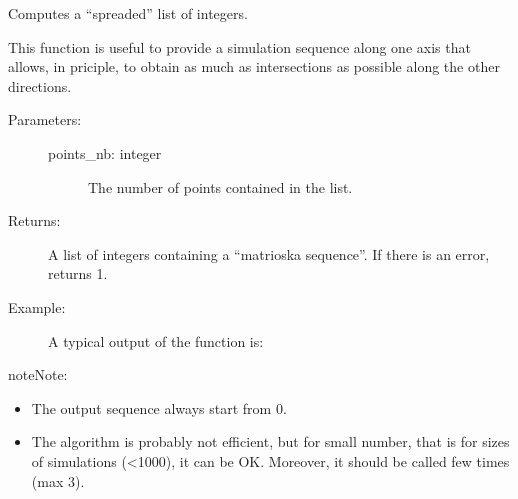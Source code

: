 \documentclass[letterpaper,10pt,english]{sphinxmanual}
\begin{document}
\begin{fulllineitems}
\label{\detokenize{appendices:s2Dcd.s2Dcd.matrioska_interval}}
Computes a “spreaded” list of integers.

This function is useful to provide a simulation sequence along one
axis that allows, in priciple, to obtain as much as intersections
as possible along the other directions.
\begin{description}
\item[{Parameters:}] \leavevmode\begin{description}
\item[{points\_nb: integer}] \leavevmode
The number of points contained in the list.

\end{description}

\item[{Returns:}] \leavevmode
A list of integers containing a “matrioska sequence”.
If there is an error, returns \sphinxhyphen{}1.

\item[{Example:}] \leavevmode
A typical output of the function is:

\begin{sphinxVerbatim}[commandchars=\\\{\}]
\end{sphinxVerbatim}

\end{description}

\begin{sphinxadmonition}{note}{Note:}\begin{itemize}
\item {} 
The output sequence always start from 0.

\item {} 
The algorithm is probably not efficient, but for small
number, that is for sizes of simulations (\textless{}1000), it can be
OK.  Moreover, it should be called few times (max 3).

\end{itemize}
\end{sphinxadmonition}

\end{fulllineitems}
\end{document}
